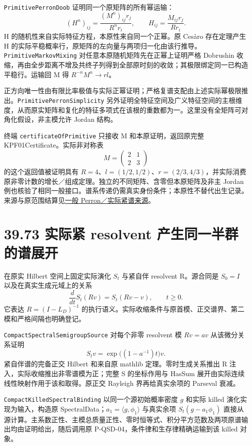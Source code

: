 \documentclass[
  11pt,
  oneside]{book}
\begin{document}
\nolinkurl{PrimitivePerronDoob} 证明同一个原矩阵的所有幂运输： \[(H^n)_{ij}=\frac{(M^n)_{ij}r_j}{R^n r_i},\qquad
H_{ij}=\frac{M_{ij}r_j}{Rr_i}.\] H 的随机性来自实际特征方程，本原性来自同一个正幂。原 Cesàro 存在定理产生 H 的实际平稳概率行，原矩阵的左向量与两项归一化由该行推导。\nolinkurl{PrimitiveMarkovMixing} 对任意本原随机矩阵先在正幂上证明严格 Dobrushin 收缩，再由全步距离不增及共终子列得到全部原时刻的收敛；其极限绑定同一已构造平稳行。运输回 M 得 \(R^{-n}M^n\to rl\)。

正方向唯一性由有限比率极值与实际正幂证明；严格复谱支配由上述实际幂极限推出。\nolinkurl{PrimitivePerronSimplicity} 另外证明全特征空间及广义特征空间的主根维度，从而原实矩阵和复化的特征多项式在该根的重数都为一。这里没有全矩阵可对角化假设，非主模允许 Jordan 结构。

终端 \nolinkurl{certificateOfPrimitive} 只接收 M 和本原证明，返回原完整 KPF01Certificate。实际非对称表 \[M=\begin{pmatrix}2&1\\2&3\end{pmatrix}\] 的这个返回值被证明具有 \(R=4\)、\(l=(1/2,1/2)\)、\(r=(2/3,4/3)\)，并实际消费原非零计数的增长／组成定理。独立的不同矩阵、含零但本原矩阵及非主 Jordan 例也核验了相同一般接口。谱系传递仍需真实身份条件；本原性不替代出生记录。来源与原范围结算见\href{../formalization/ueot-core/docs/compression/theory_completion/unified_closure/general_perron_compact_spectral_source_v1/RESULTS_AND_OPEN_OBLIGATIONS.md}{一般 Perron／实际紧谱来源}。

\section{39.73 实际紧 resolvent 产生同一半群的谱展开}\label{ux5b9eux9645ux7d27-resolvent-ux4ea7ux751fux540cux4e00ux534aux7fa4ux7684ux8c31ux5c55ux5f00}

在原实 Hilbert 空间上固定实际演化 \(S_t\) 与紧自伴 resolvent R。源合同是 \(S_0=I\) 以及在真实生成元域上的关系 \[\frac{d}{dt}S_t(Rv)=S_t(Rv-v),\qquad t\ge0.\] 它表达 \(R=(I-L_D)^{-1}\) 的执行语义。实际收缩条件与原首模、正交谱界、第二模和严格间隔也明确登记。

\nolinkurl{CompactSpectralSemigroupSource} 对每个非零 resolvent 模 \(Rv=av\) 从该微分关系证明 \[S_tv=\exp\!\bigl((1-a^{-1})t\bigr)v.\] 紧自伴谱的完备正交 Hilbert 和来自原 mathlib 定理。零时生成关系推出 R 注入，实际收缩推出非零谱模为正；完整 S 的坐标作用与 HasSum 展开由实际连续线性映射作用于该和取得。原正交 Rayleigh 界再给真实余项的 Parseval 衰减。

\nolinkurl{CompactKilledSpectralBinding} 以同一个源初始概率密度 \(g\) 和实际 killed 演化实现为输入，构造原 SpectralData；\(a_1=\langle g,\phi_1\rangle\) 与真实余项 \(S_t(g-a_1\phi_1)\) 直接从源计算。主系数正性、主模总质量正性、零时恒等式、积分平方范数及两项原谱输出均由证明给出，随后调用原 P-QSD-04，条件律和生存律精确运输到该 killed 对象。
\end{document}
